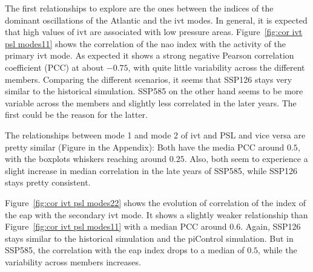 The first relationships to explore are the ones between the indices of the dominant oscillations of the Atlantic and the \ac{ivt} modes. 
In general, it is expected that high values of \ac{ivt} are associated with low pressure areas.
Figure~\ref{fig:cor ivt psl modes11} shows the correlation of the \ac{nao} index with the activity of the primary \ac{ivt} mode. 
As expected it shows a strong negative Pearson correlation coefficient (PCC) at about $-0.75$, with quite little variability across the different members. 
Comparing the different scenarios, it seems that SSP126 stays very similar to the historical simulation. 
SSP585 on the other hand seems to be more variable across the members and slightly less correlated in the later years. The first could be the reason for the latter. 

%

The relationships between mode 1 and mode 2 of \ac{ivt} and PSL and vice versa are pretty similar (Figure in the Appendix): 
Both have the media PCC around $0.5$, with the boxplots whiskers reaching around $0.25$. 
Also, both seem to experience a slight increase in median correlation in the late years of SSP585, while SSP126 stays pretty consistent. 




%
%

Figure~\ref{fig:cor ivt psl modes22} shows the evolution of correlation of the index of the \ac{eap} with the secondary \ac{ivt} mode. 
It shows a slightly weaker relationship than Figure~\ref{fig:cor ivt psl modes11} with a median PCC around $0.6$. 
Again, SSP126 stays similar to the historical simulation and the piControl simulation. 
But in SSP585, the correlation with the \ac{eap} index drops to a median of $0.5$, while the variability across members increases. 




